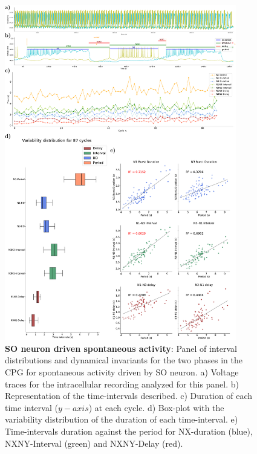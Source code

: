  
\begin{figure}[htbp]
	\centering
	\includegraphics[width=0.9\textwidth]{./img/invariants/data/SUSSEX/prep4_so_driven_2/images/panel_with_intervals.pdf}
	\caption{\textbf{SO neuron driven spontaneous  activity}: Panel of interval distributions and dynamical invariants for the two phases in the CPG for spontaneous activity driven by SO neuron. a) Voltage traces for the intracellular recording analyzed for this panel. b) Representation of the time-intervals described. c) Duration of each time interval ($y-axis$) at each cycle. d) Box-plot with the variability distribution of the duration of each time-interval. e) Time-intervals duration against the period for NX-duration (blue), NXNY-Interval (green) and NXNY-Delay (red).}
	\label{fig:so spontaneous invariants 2}
\end{figure}


